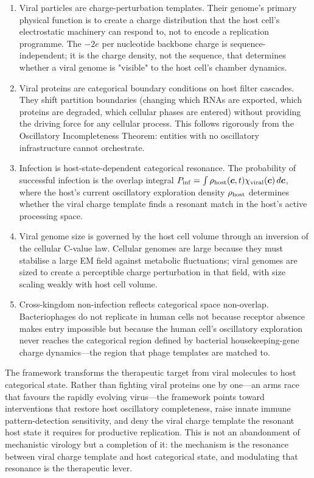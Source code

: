 \begin{enumerate}[(1)]
  \item Viral particles are charge-perturbation templates. Their genome's primary physical function is to create a charge distribution that the host cell's electrostatic machinery can respond to, not to encode a replication programme. The $-2e$ per nucleotide backbone charge is sequence-independent; it is the charge density, not the sequence, that determines whether a viral genome is "visible" to the host cell's chamber dynamics.

  \item Viral proteins are categorical boundary conditions on host filter cascades. They shift partition boundaries (changing which RNAs are exported, which proteins are degraded, which cellular phases are entered) without providing the driving force for any cellular process. This follows rigorously from the Oscillatory Incompleteness Theorem: entities with no oscillatory infrastructure cannot orchestrate.

  \item Infection is host-state-dependent categorical resonance. The probability of successful infection is the overlap integral $P_{\mathrm{inf}} = \int \rho_{\mathrm{host}}(\boldsymbol{c},t) \chi_{\mathrm{viral}}(\boldsymbol{c})\,d\boldsymbol{c}$, where the host's current oscillatory exploration density $\rho_{\mathrm{host}}$ determines whether the viral charge template finds a resonant match in the host's active processing space.

  \item Viral genome size is governed by the host cell volume through an inversion of the cellular C-value law. Cellular genomes are large because they must stabilise a large EM field against metabolic fluctuations; viral genomes are sized to create a perceptible charge perturbation in that field, with size scaling weakly with host cell volume.

  \item Cross-kingdom non-infection reflects categorical space non-overlap. Bacteriophages do not replicate in human cells not because receptor absence makes entry impossible but because the human cell's oscillatory exploration never reaches the categorical region defined by bacterial housekeeping-gene charge dynamics---the region that phage templates are matched to.
\end{enumerate}

The framework transforms the therapeutic target from viral molecules to host categorical state. Rather than fighting viral proteins one by one---an arms race that favours the rapidly evolving virus---the framework points toward interventions that restore host oscillatory completeness, raise innate immune pattern-detection sensitivity, and deny the viral charge template the resonant host state it requires for productive replication. This is not an abandonment of mechanistic virology but a completion of it: the mechanism is the resonance between viral charge template and host categorical state, and modulating that resonance is the therapeutic lever.

